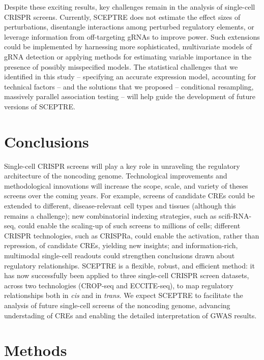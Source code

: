 \documentclass{article}
\begin{document}
Despite these exciting results, key challenges remain in the analysis of single-cell CRISPR screens. Currently, SCEPTRE does not estimate the effect sizes of perturbations, disentangle interactions among perturbed regulatory elements\cite{Zamanighomi2019,Norman2019}, or leverage information from off-targeting gRNAs to improve power. Such extensions could be implemented by harnessing more sophisticated, multivariate models of gRNA detection or applying methods for estimating variable importance in the presence of possibly misspecified models\cite{Zhang2020}. The statistical challenges that we identified in this study -- specifying an accurate expression model, accounting for technical factors -- and the solutions that we proposed -- conditional resampling, massively parallel association testing -- will help guide the development of future versions of SCEPTRE.

\section*{Conclusions}

Single-cell CRISPR screens will play a key role in unraveling the regulatory architecture of the noncoding genome\cite{Przybyla2021}. Technological improvements and methodological innovations will increase the scope, scale, and variety of theses screens over the coming years. For example, screens of candidate CREs could be extended to different, disease-relevant cell types and tissues (although this remains a challenge); new combinatorial indexing strategies, such as scifi-RNA-seq, could enable the scaling-up of such screens to millions of cells\cite{Datlinger2021}; different CRISPR technologies, such as CRISPRa, could enable the activation, rather than repression, of candidate CREs, yielding new insights; and information-rich, multimodal single-cell readouts could strengthen conclusions drawn about regulatory relationships\cite{Pierce2020}. SCEPTRE is a flexible, robust, and efficient method: it has now successfully been applied to three single-cell CRISPR screen datasets, across two technologies (CROP-seq and ECCITE-seq), to map regulatory relationships both in \textit{cis} and in \textit{trans}. We expect SCEPTRE to facilitate the analysis of future single-cell screens of the noncoding genome, advancing understading of CREs and enabling the detailed interpretation of GWAS results.

\section*{Methods}
\end{document}
